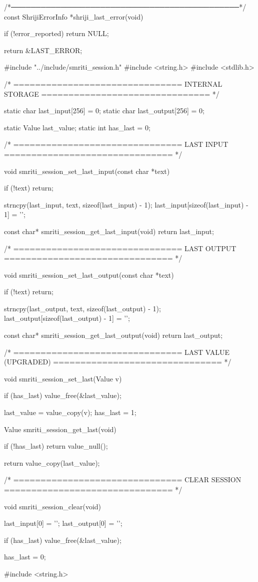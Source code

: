 \documentclass{article}
\begin{document}
/*──────────────────────────────────────────────*/
const ShrijiErrorInfo *shriji_last_error(void)
{
    if (!error_reported)
        return NULL;

    return &LAST_ERROR;
}
#include "../include/smriti_session.h"
#include <string.h>
#include <stdlib.h>

/* ===============================
   INTERNAL STORAGE
   =============================== */

static char last_input[256] = {0};
static char last_output[256] = {0};

static Value last_value;
static int has_last = 0;

/* ===============================
   LAST INPUT
   =============================== */

void smriti_session_set_last_input(const char *text)
{
    if (!text) return;

    strncpy(last_input, text, sizeof(last_input) - 1);
    last_input[sizeof(last_input) - 1] = '\0';
}

const char* smriti_session_get_last_input(void)
{
    return last_input;
}

/* ===============================
   LAST OUTPUT
   =============================== */

void smriti_session_set_last_output(const char *text)
{
    if (!text) return;

    strncpy(last_output, text, sizeof(last_output) - 1);
    last_output[sizeof(last_output) - 1] = '\0';
}

const char* smriti_session_get_last_output(void)
{
    return last_output;
}

/* ===============================
   LAST VALUE (UPGRADED)
   =============================== */

void smriti_session_set_last(Value v)
{
    if (has_last)
        value_free(&last_value);

    last_value = value_copy(v);
    has_last = 1;
}

Value smriti_session_get_last(void)
{
    if (!has_last)
        return value_null();

    return value_copy(last_value);
}

/* ===============================
   CLEAR SESSION
   =============================== */

void smriti_session_clear(void)
{
    last_input[0] = '\0';
    last_output[0] = '\0';

    if (has_last)
        value_free(&last_value);

    has_last = 0;
}
#include <string.h>
\end{document}
